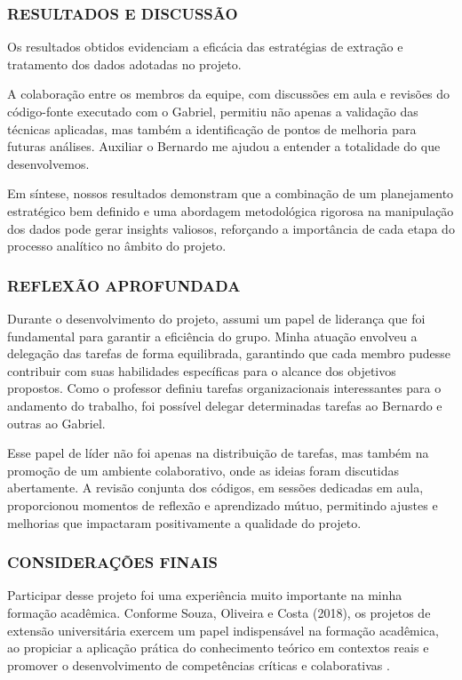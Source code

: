 \documentclass{article}
\begin{document}
\subsubsection{RESULTADOS E DISCUSSÃO}
Os resultados obtidos evidenciam a eficácia das estratégias de extração e tratamento dos dados adotadas no projeto.

A colaboração entre os membros da equipe, com discussões em aula e revisões do código-fonte executado com o Gabriel, permitiu não apenas a validação das técnicas aplicadas, mas também a identificação de pontos de melhoria para futuras análises. Auxiliar o Bernardo me ajudou a entender a totalidade do que desenvolvemos.

Em síntese, nossos resultados demonstram que a combinação de um planejamento estratégico bem definido e uma abordagem metodológica rigorosa na manipulação dos dados pode gerar insights valiosos, reforçando a importância de cada etapa do processo analítico no âmbito do projeto.

\subsubsection{REFLEXÃO APROFUNDADA}
Durante o desenvolvimento do projeto, assumi um papel de liderança que foi fundamental para garantir a eficiência do grupo. Minha atuação envolveu a delegação das tarefas de forma equilibrada, garantindo que cada membro pudesse contribuir com suas habilidades específicas para o alcance dos objetivos propostos. Como o professor definiu tarefas organizacionais interessantes para o andamento do trabalho, foi possível delegar determinadas tarefas ao Bernardo e outras ao Gabriel.

Esse papel de líder não foi apenas na distribuição de tarefas, mas também na promoção de um ambiente colaborativo, onde as ideias foram discutidas abertamente. A revisão conjunta dos códigos, em sessões dedicadas em aula, proporcionou momentos de reflexão e aprendizado mútuo, permitindo ajustes e melhorias que impactaram positivamente a qualidade do projeto.

\subsubsection{CONSIDERAÇÕES FINAIS}

Participar desse projeto foi uma experiência muito importante na minha formação acadêmica. Conforme Souza, Oliveira e Costa (2018), os projetos de extensão universitária exercem um papel indispensável na formação acadêmica, ao propiciar a aplicação prática do conhecimento teórico em contextos reais e promover o desenvolvimento de competências críticas e colaborativas \cite{souza2018projetos}.
\end{document}
